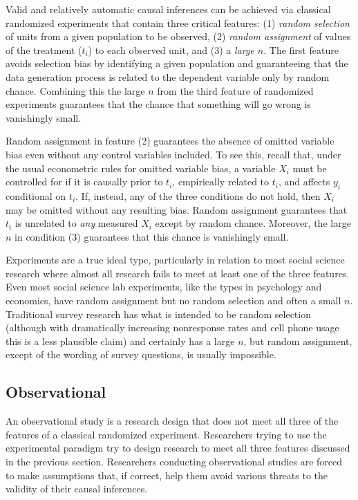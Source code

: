 \documentclass[11pt,titlepage]{article}
\begin{document}
Valid and relatively automatic causal inferences can be achieved via
classical randomized experiments that contain three critical features:
(1) \emph{random selection} of units from a given population to be
observed, (2) \emph{random assignment} of values of the treatment
($t_i$) to each observed unit, and (3) a \emph{large $n$}.  The first
feature avoids selection bias by identifying a given population and
guaranteeing that the data generation process is related to the
dependent variable only by random chance.  Combining this the large
$n$ from the third feature of randomized experiments guarantees that
the chance that something will go wrong is vanishingly small.

Random assignment in feature (2) guarantees the absence of omitted
variable bias even without any control variables included.  To see
this, recall that, under the usual econometric rules for omitted
variable bias, a variable $X_i$ must be controlled for if it is
causally prior to $t_i$, empirically related to $t_i$, and affects
$y_i$ conditional on $t_i$.  If, instead, any of the three conditions
do not hold, then $X_i$ may be omitted without any resulting bias.
Random assignment guarantees that $t_i$ is unrelated to \emph{any}
measured $X_i$ except by random chance.  Moreover, the large $n$ in
condition (3) guarantees that this chance is vanishingly small.

Experiments are a true ideal type, particularly in relation to most
social science research where almost all research fails to meet at
least one of the three features.  Even most social science lab
experiments, like the types in psychology and economics, have random
assignment but no random selection and often a small $n$.  Traditional
survey research has what is intended to be random selection (although
with dramatically increasing nonresponse rates and cell phone usage
this is a less plausible claim) and certainly has a large $n$, but
random assignment, except of the wording of survey questions, is
usually impossible.

\subsection{Observational}

An observational study is a research design that does not meet all
three of the features of a classical randomized experiment.
Researchers trying to use the experimental paradigm try to design
research to meet all three features discussed in the previous section.
Researchers conducting observational studies are forced to make
assumptions that, if correct, help them avoid various threats to the
validity of their causal inferences.
\end{document}
